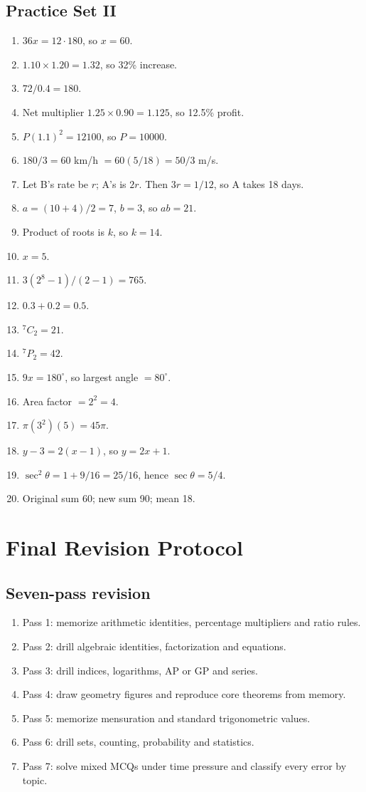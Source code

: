 \documentclass[12pt,a4paper,oneside]{book}
\begin{document}
\section{Practice Set II}
\begin{enumerate}[label=\textbf{Q\arabic*.}, leftmargin=*]
\item \(36x=12\cdot180\), so \(x=60\).
\item \(1.10\times1.20=1.32\), so 32\% increase.
\item \(72/0.4=180\).
\item Net multiplier \(1.25\times0.90=1.125\), so 12.5\% profit.
\item \(P(1.1)^2=12100\), so \(P=10000\).
\item \(180/3=60\) km/h \(=60(5/18)=50/3\) m/s.
\item Let B's rate be \(r\); A's is \(2r\). Then \(3r=1/12\), so A takes 18 days.
\item \(a=(10+4)/2=7\), \(b=3\), so \(ab=21\).
\item Product of roots is \(k\), so \(k=14\).
\item \(x=5\).
\item \(3(2^8-1)/(2-1)=765\).
\item \(0.3+0.2=0.5\).
\item \({}^7C_2=21\).
\item \({}^7P_2=42\).
\item \(9x=180^\circ\), so largest angle \(=80^\circ\).
\item Area factor \(=2^2=4\).
\item \(\pi(3^2)(5)=45\pi\).
\item \(y-3=2(x-1)\), so \(y=2x+1\).
\item \(\sec^2\theta=1+9/16=25/16\), hence \(\sec\theta=5/4\).
\item Original sum 60; new sum 90; mean 18.
\end{enumerate}

\chapter[Final Revision Protocol]{Final Revision Protocol}
\section{Seven-pass revision}
\begin{enumerate}[label=\arabic*.]
\item Pass 1: memorize arithmetic identities, percentage multipliers and ratio rules.
\item Pass 2: drill algebraic identities, factorization and equations.
\item Pass 3: drill indices, logarithms, AP or GP and series.
\item Pass 4: draw geometry figures and reproduce core theorems from memory.
\item Pass 5: memorize mensuration and standard trigonometric values.
\item Pass 6: drill sets, counting, probability and statistics.
\item Pass 7: solve mixed MCQs under time pressure and classify every error by topic.
\end{enumerate}
\end{document}
